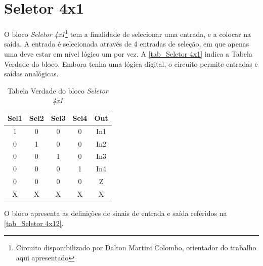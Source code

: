 \renewcommand{\NomeBloco}{\emph{Seletor 4x1}}
\renewcommand{\NomeBlocoNoIt}{Seletor 4x1}
\renewcommand{\NomePTab}{tab_\NomeBlocoNoIt}
\renewcommand{\NomeSTab}{tab_\NomeBlocoNoIt2}
\renewcommand{\NomePFig}{fig_\NomeBlocoNoIt}
\renewcommand{\NomeSFig}{fig_\NomeBlocoNoIt2}
\renewcommand{\NomeTTab}{tab_\NomeBlocoNoIt3}

\section{Seletor 4x1}

O bloco \NomeBloco{}\footnote{Circuito disponibilizado por Dalton Martini Colombo, orientador do trabalho aqui apresentado} tem a finalidade de selecionar uma entrada, e a colocar na sa\'ida. A entrada \'e selecionada atrav\'es de 4 entradas de seleção, em que apenas uma deve estar em n\'ivel l\'ogico um por vez. A \autoref{\NomePTab} indica a Tabela Verdade do bloco. Embora tenha uma l\'ogica digital, o circuito permite entradas e sa\'idas anal\'ogicas.

\begin{table}[htbp]

\caption{Tabela Verdade do bloco \NomeBloco}%
\label{\NomePTab}
\centering
\begin{tabular}{ccccc}
    \toprule
    Sel1 & Sel2 & Sel3 & Sel4 & Out \\
    \midrule \midrule
    1 & 0 & 0 & 0 & In1 \\
    \midrule
    0 & 1 & 0 & 0 & In2 \\
    \midrule
    0 & 0 & 1 & 0 & In3 \\
    \midrule
    0 & 0 & 0 & 1 & In4 \\
    \midrule
    0 & 0 & 0 & 0 & Z \\
    \midrule
    X & X & X & X & X \\
\bottomrule

\end{tabular}
\end{table}

O bloco apresenta as definições de sinais de entrada e sa\'ida referidos na \autoref{\NomeSTab}.

